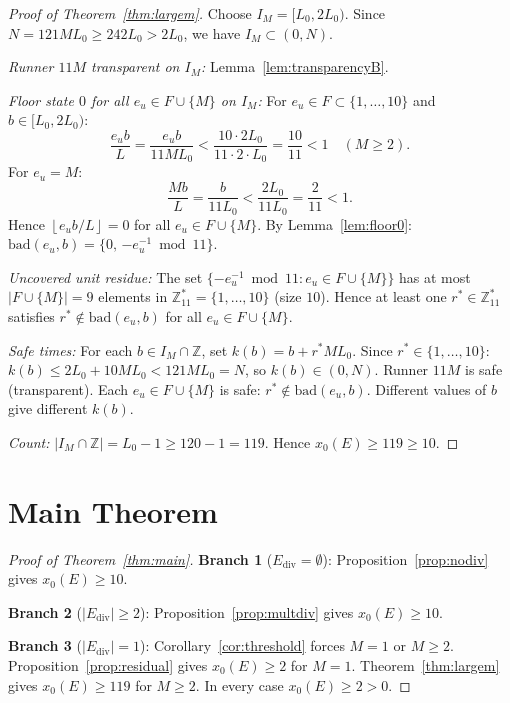 \documentclass[11pt]{article}
\theoremstyle{definition}
\newcommand{\Ediv}{E_{\mathrm{div}}}
\newcommand{\Zstar}{\mathbb{Z}_{11}^{*}}
\newcommand{\bad}{\mathrm{bad}}
\newcommand{\floor}[1]{\left\lfloor #1 \right\rfloor}
\begin{document}
\begin{proof}[Proof of Theorem~\ref{thm:largem}]
  Choose $I_M = [L_0, 2L_0)$. Since $N = 121 M L_0 \geq 242 L_0 > 2L_0$,
  we have $I_M \subset (0, N)$.

  \textit{Runner $11M$ transparent on $I_M$:} Lemma~\ref{lem:transparencyB}.

  \textit{Floor state $0$ for all $e_u \in F \cup \{M\}$ on $I_M$:}
  For $e_u \in F \subset \{1,\ldots,10\}$ and $b \in [L_0, 2L_0)$:
  \[
    \frac{e_u b}{L} = \frac{e_u b}{11 M L_0}
      < \frac{10 \cdot 2 L_0}{11 \cdot 2 \cdot L_0}
      = \frac{10}{11} < 1
      \quad (M \geq 2).
  \]
  For $e_u = M$:
  \[
    \frac{M b}{L} = \frac{b}{11 L_0}
      < \frac{2 L_0}{11 L_0} = \frac{2}{11} < 1.
  \]
  Hence $\floor{e_u b/L} = 0$ for all $e_u \in F \cup \{M\}$.
  By Lemma~\ref{lem:floor0}: $\bad(e_u, b) = \{0,\, {-e_u^{-1}} \bmod 11\}$.

  \textit{Uncovered unit residue:}
  The set $\{{-e_u^{-1}} \bmod 11 : e_u \in F \cup \{M\}\}$ has at most
  $|F \cup \{M\}| = 9$ elements in $\Zstar = \{1,\ldots,10\}$
  (size $10$).
  Hence at least one $r^* \in \Zstar$ satisfies
  $r^* \notin \bad(e_u, b)$ for all $e_u \in F \cup \{M\}$.

  \textit{Safe times:}
  For each $b \in I_M \cap \mathbb{Z}$, set $k(b) = b + r^* M L_0$.
  Since $r^* \in \{1,\ldots,10\}$:
  $k(b) \leq 2L_0 + 10 M L_0 < 121 M L_0 = N$, so $k(b) \in (0, N)$.
  Runner $11M$ is safe (transparent).
  Each $e_u \in F \cup \{M\}$ is safe: $r^* \notin \bad(e_u, b)$.
  Different values of $b$ give different $k(b)$.

  \textit{Count:}
  $|I_M \cap \mathbb{Z}| = L_0 - 1 \geq 120 - 1 = 119$.
  Hence $x_0(E) \geq 119 \geq 10$.
\end{proof}

\section{Main Theorem}

\begin{proof}[Proof of Theorem~\ref{thm:main}]
  \textbf{Branch 1} ($\Ediv = \emptyset$):
  Proposition~\ref{prop:nodiv} gives $x_0(E) \geq 10$.

  \textbf{Branch 2} ($|\Ediv| \geq 2$):
  Proposition~\ref{prop:multdiv} gives $x_0(E) \geq 10$.

  \textbf{Branch 3} ($|\Ediv| = 1$):
  Corollary~\ref{cor:threshold} forces $M = 1$ or $M \geq 2$.
  Proposition~\ref{prop:residual} gives $x_0(E) \geq 2$ for $M = 1$.
  Theorem~\ref{thm:largem} gives $x_0(E) \geq 119$ for $M \geq 2$.
  In every case $x_0(E) \geq 2 > 0$.
\end{proof}
\end{document}
